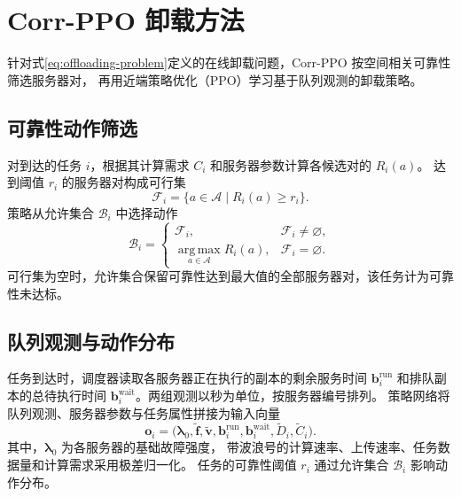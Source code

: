\documentclass[UTF8,fontset=fandol]{ctexart}
\begin{document}
\section{Corr-PPO 卸载方法}
\label{sec:offloading-method}

针对式\eqref{eq:offloading-problem}定义的在线卸载问题，Corr-PPO 按空间相关可靠性筛选服务器对，
再用近端策略优化（PPO）学习基于队列观测的卸载策略。

\subsection{可靠性动作筛选}
\label{sec:reliability-action-mask}

对到达的任务 \(i\)，根据其计算需求 \(C_i\) 和服务器参数计算各候选对的 \(R_i(a)\)。
达到阈值 \(r_i\) 的服务器对构成可行集
\begin{equation}
  \mathcal{F}_i=\{a\in\mathcal{A}\mid R_i(a)\geq r_i\}.
  \label{eq:feasible-server-pairs}
\end{equation}
策略从允许集合 \(\mathcal{B}_i\) 中选择动作
\begin{equation}
  \mathcal{B}_i=
  \begin{cases}
    \mathcal{F}_i, & \mathcal{F}_i\neq\varnothing,\\
    \displaystyle\operatorname*{arg\,max}_{a\in\mathcal{A}} R_i(a),
      & \mathcal{F}_i=\varnothing .
  \end{cases}
  \label{eq:allowed-server-pairs}
\end{equation}
可行集为空时，允许集合保留可靠性达到最大值的全部服务器对，该任务计为可靠性未达标。

\subsection{队列观测与动作分布}
\label{sec:queue-aware-policy}

任务到达时，调度器读取各服务器正在执行的副本的剩余服务时间
\(\boldsymbol{b}^{\mathrm{run}}_i\) 和排队副本的总待执行时间
\(\boldsymbol{b}^{\mathrm{wait}}_i\)。两组观测以秒为单位，按服务器编号排列。
策略网络将队列观测、服务器参数与任务属性拼接为输入向量
\begin{equation}
  \boldsymbol{o}_i=
  \bigl(\boldsymbol{\lambda}_0,\widetilde{\boldsymbol{f}},
    \widetilde{\boldsymbol{v}},\boldsymbol{b}^{\mathrm{run}}_i,
    \boldsymbol{b}^{\mathrm{wait}}_i,\widetilde{D}_i,\widetilde{C}_i\bigr).
  \label{eq:offloading-observation}
\end{equation}
其中，\(\boldsymbol{\lambda}_0\) 为各服务器的基础故障强度，
带波浪号的计算速率、上传速率、任务数据量和计算需求采用极差归一化。
任务的可靠性阈值 \(r_i\) 通过允许集合 \(\mathcal{B}_i\) 影响动作分布。
\end{document}
